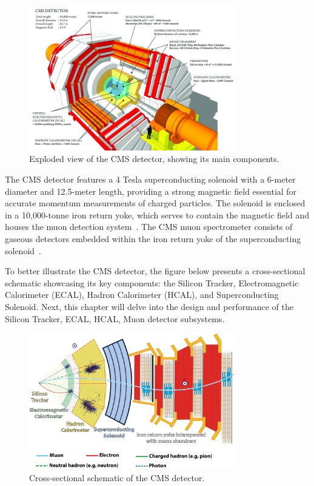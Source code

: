 \begin{figure}[ht]
\centering
\includegraphics[width=0.8\textwidth]{Figures/CMS Detector Schematic.png} %
\caption{Exploded view of the CMS detector, showing its main components.}
\label{fig:cms_detector}
\end{figure}

The CMS detector features a 4 Tesla superconducting solenoid with a 6-meter diameter and 12.5-meter length, providing a strong magnetic field essential for accurate momentum measurements of charged particles. The solenoid is enclosed in a 10,000-tonne iron return yoke, which serves to contain the magnetic field and houses the muon detection system~\cite{superconducting_magnet}. The CMS muon spectrometer consists of gaseous detectors embedded within the iron return yoke of the superconducting solenoid~\cite{4436524}.

To better illustrate the CMS detector, the figure below presents a cross-sectional schematic showcasing its key components: the Silicon Tracker, Electromagnetic Calorimeter (ECAL), Hadron Calorimeter (HCAL), and Superconducting Solenoid. Next, this chapter will delve into the design and performance of the Silicon Tracker, ECAL, HCAL, Muon detector subsystems.

\begin{figure}[ht]
\centering
\includegraphics[width=0.8\textwidth]{Figures/CMS Slice White Background.png} %
\caption{Cross-sectional schematic of the CMS detector.}
\label{fig:cms_tracker}
\end{figure}

